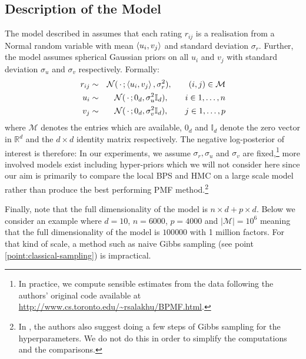 \subsection{Description of the  Model}

The model described in \citet{mnih08} assumes that each rating $r_{ij}$ is a realisation from a Normal random variable with mean $\left\langle u_{i}, v_{j} \right\rangle$ and standard deviation $\sigma_{r}$. 
Further, the model assumes spherical Gaussian priors on all $u_{i}$ and $v_{j}$ with standard deviation $\sigma_{u}$ and $\sigma_{v}$ respectively. Formally:
%
\begin{eqnarray}
	r_{ij} &\sim& \mathcal N(\,\cdot\, ; \left\langle u_{i}, v_{j} \right\rangle, \sigma_{r}^{2}), \qquad (i,j)\in\mathcal M\nonumber\\
	u_{i} &\sim& \mathcal N(\,\cdot\, ; 0_{d}, \sigma_{u}^{2}\mathbb I_{d}), \qquad i\in 1,\dots,n \label{eq:pmf-model}\\
	v_{j} &\sim& \mathcal N(\,\cdot\, ; 0_{d}, \sigma_{v}^{2}\mathbb I_{d}), \qquad j\in 1,\dots,p\nonumber
\end{eqnarray}
%
where $\mathcal M$ denotes the entries which are available, $0_{d}$ and $\mathbb I_{d}$ denote the zero vector in $\mathbb R^{d}$ and the $d\times d$ identity matrix respectively. 
The negative log-posterior of interest is therefore:
%
%
In our experiments, we assume $\sigma_{r}, \sigma_{u}$ and $\sigma_{v}$ are fixed,\footnote{In practice, we compute sensible estimates from the data following the authors' original code available at \url{http://www.cs.toronto.edu/~rsalakhu/BPMF.html}.} more involved models exist including hyper-priors which we will not consider here since our aim is primarily to compare the local BPS and HMC on a large scale model rather than produce the best performing PMF method.\footnote{In \citep{mnih08}, the authors also suggest doing a few steps of Gibbs sampling for the hyperparameters. We do not do this in order to simplify the computations and the comparisons.}

Finally, note that the full dimensionality of the model is $n\times d + p\times d$. Below we consider an example where $d=10$, $n=6000$, $p=4000$ and $|\mathcal M|=10^{6}$ meaning that the full dimensionality of the model is $100 000$ with 1 million factors. For that kind of scale, a method such as naive Gibbs sampling (see point \ref{point:classical-sampling}) is impractical. 



